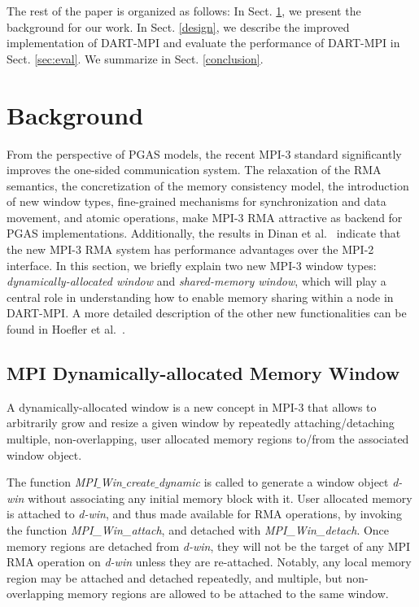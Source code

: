 \documentclass{llncs}
\newcommand{\todo}[1]{}
\newcommand{\MPI}[1]{\mbox{MPI-#1}\xspace}
\begin{document}
\todo{Rest of paragraph into discussion?!\\
This work has demonstrated
that the shared-memory functionality proposed in the \MPI3
benefits the \mbox{DART-MPI} intra-node blocking RMA operations. However, \mbox{DART-MPI} turns
to the MPI RMA operations for the non-blocking or inter-node scenario,
leading to low performance.}

The rest of the paper is organized as follows: In Sect. \ref{background}, we present the background for our work. In Sect. \ref{design},
we describe the improved implementation of \mbox{DART-MPI} and evaluate the performance of \mbox{DART-MPI} in Sect. \ref{sec:eval}. We summarize in Sect. \ref{conclusion}.

\section{Background}
\label{background}
From the perspective of PGAS models, the recent \MPI3 standard
\cite{mpi3} significantly improves the one-sided communication
system. The relaxation of the RMA semantics, the
concretization of the memory consistency model, the introduction of
new window types, fine-grained mechanisms for
synchronization and data movement, and atomic operations, make MPI-3 RMA attractive as backend for PGAS implementations. Additionally, the results
in Dinan et al.~\cite{Dinan} indicate that the new \MPI3 RMA system has
performance advantages over the \MPI2 interface.  In this section, we
briefly explain two new \MPI3 window types:
\emph{dynamically-allocated window} and \emph{shared-memory window},
which will play a central role in understanding how to enable memory sharing
within a node in \mbox{DART-MPI}.  A more detailed description
of the other new functionalities can be found in Hoefler et al.~\cite{Hoefler}.

\subsection{MPI Dynamically-allocated Memory Window}
A dynamically-allocated window is a new concept in \MPI3 that allows to
arbitrarily grow and resize a given window by repeatedly attaching/detaching multiple, 
non-overlapping, user allocated memory regions to/from the associated 
window object.

The function \textit{MPI$\_$Win$\_$create$\_$dynamic} is called
to generate a window object \textit{d-win} without associating any
initial memory block with it. User allocated memory is attached to
\textit{d-win}, and thus made available for RMA operations, by
invoking the function \textit{MPI\_Win\_attach}, and detached with
\textit{MPI\_Win\_detach}.  Once memory regions are detached from
\textit{d-win}, they will not be the target of any MPI RMA operation
on \textit{d-win} unless they are re-attached. Notably, any local
memory region may be attached and detached repeatedly, and multiple,
but \mbox{non-overlapping} memory regions are allowed to be attached
to the same window. 
\end{document}
